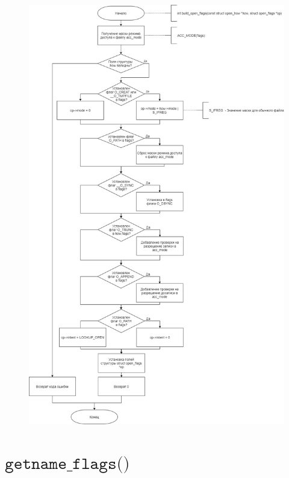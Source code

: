 \documentclass[a4paper,14pt]{extreport}
\begin{document}
\begin{figure}[H]
	\centering
	\includegraphics[scale=0.45]{img/build_open_flags.jpg}
\end{figure}




















\section{$\texttt{getname\_flags()}$}
\end{document}
